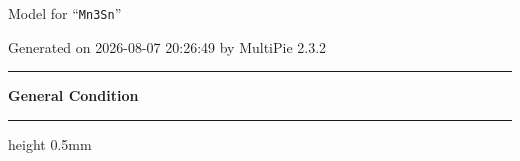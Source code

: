 \documentclass[fleqn,10pt,landscape]{jsarticle}
\begin{document}
\setcounter{MaxMatrixCols}{32}

\renewcommand{\tablename}{Table~}
\renewcommand{\figurename}{Figure~}
\setlength{\baselineskip}{16pt}
\setlength{\parindent}{0pt}
\setlength{\mathindent}{0pt}
\footnotesize
\begin{center}
\LARGE
Model for ``\texttt{Mn3Sn}''
\end{center}
\begin{flushright}
Generated on 2026-08-07 20:26:49 by MultiPie 2.3.2
\end{flushright}
\setlength{\baselineskip}{16pt}
\footnotesize
\vspace{5mm}
\noindent \rule[0.5mm]{5mm}{0.5mm}\hspace{3mm}\textbf{General Condition}\hspace{3mm}\leaders\hrule height 0.5mm\hfill\kern0pt
\vspace{3mm}
\end{document}
